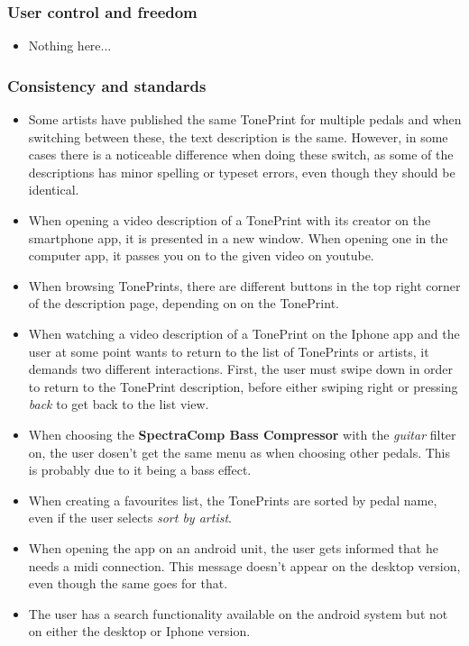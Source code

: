 \subsubsection{User control and freedom}
\begin{itemize}
	\item Nothing here...
\end{itemize}
%
\subsubsection{Consistency and standards}
\begin{itemize}
	\item Some artists have published the same TonePrint for multiple pedals and when switching between these, the text description is the same. However, in some cases there is a noticeable difference when doing these switch, as some of the descriptions has minor spelling or typeset errors, even though they should be identical.\\
	\item When opening a video description of a TonePrint with its creator on the smartphone app, it is presented in a new window. When opening one in the computer app, it passes you on to the given video on youtube. \\
	\item When browsing TonePrints, there are different buttons in the top right corner of the description page, depending on on the TonePrint.\\
	\item When watching a video description of a TonePrint on the Iphone app and the user at some point wants to return to the list of TonePrints or artists, it demands two different interactions. First, the user must swipe down in order to return to the TonePrint description, before either swiping right or pressing \textit{back} to get back to the list view.\\
	\item When choosing the \textbf{SpectraComp Bass Compressor} with the \textit{guitar} filter on, the user dosen't get the same menu as when choosing other pedals. This is probably due to it being a bass effect.\\
	\item When creating a favourites list, the TonePrints are sorted by pedal name, even if the user selects \textit{sort by artist}.\\
	\item When opening the app on an android unit, the user gets informed that he needs a midi connection. This message doesn't appear on the desktop version, even though the same goes for that.\\
	\item The user has a search functionality available on the android system but not on either the desktop or Iphone version.
\end{itemize}
%
